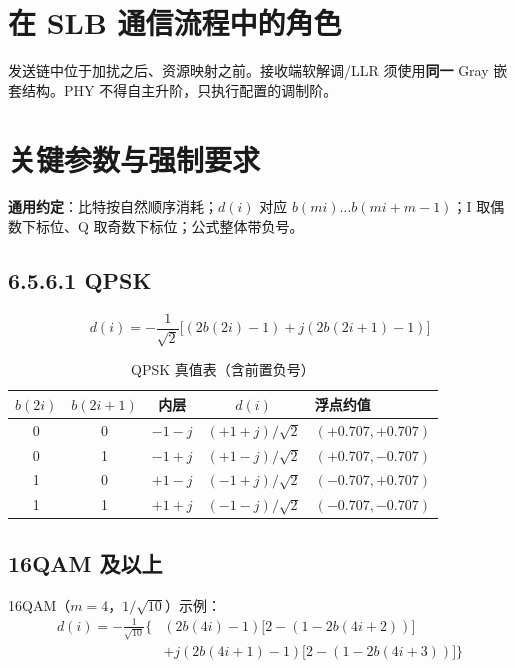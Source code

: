 \documentclass[11pt,a4paper]{ctexart}
\begin{document}
\section{在 SLB 通信流程中的角色}

发送链中位于加扰之后、资源映射之前。接收端软解调/LLR 须使用\textbf{同一} Gray 嵌套结构。PHY 不得自主升阶，只执行配置的调制阶。

\section{关键参数与强制要求}

\textbf{通用约定}：比特按自然顺序消耗；$d(i)$ 对应 $b(mi)\ldots b(mi+m-1)$；I 取偶数下标位、Q 取奇数下标位；公式整体带负号。

\subsection{6.5.6.1 QPSK}

\begin{equation}
d(i)=-\frac{1}{\sqrt{2}}\bigl[(2b(2i)-1)+j(2b(2i+1)-1)\bigr]
\end{equation}

\begin{longtable}{ccccL{5cm}}
\caption{QPSK 真值表（含前置负号）\label{tab:656-qpsk}} \\
\toprule
\textbf{$b(2i)$} & \textbf{$b(2i+1)$} & \textbf{内层} & \textbf{$d(i)$} & \textbf{浮点约值} \\
 & 0 & $-1-j$ & $(+1+j)/\sqrt{2}$ & $(+0.707,+0.707)$ \\
0 & 1 & $-1+j$ & $(+1-j)/\sqrt{2}$ & $(+0.707,-0.707)$ \\
1 & 0 & $+1-j$ & $(-1+j)/\sqrt{2}$ & $(-0.707,+0.707)$ \\
1 & 1 & $+1+j$ & $(-1-j)/\sqrt{2}$ & $(-0.707,-0.707)$ \\
\bottomrule
\end{longtable}

\subsection{16QAM 及以上}

16QAM（$m{=}4$，$1/\sqrt{10}$）示例：
\begin{equation}
\begin{aligned}
d(i)=-\frac{1}{\sqrt{10}}\Big\{
&(2b(4i)-1)\bigl[2-(1-2b(4i+2))\bigr]\\
&+j(2b(4i+1)-1)\bigl[2-(1-2b(4i+3))\bigr]\Big\}
\end{aligned}
\end{equation}
\end{document}
